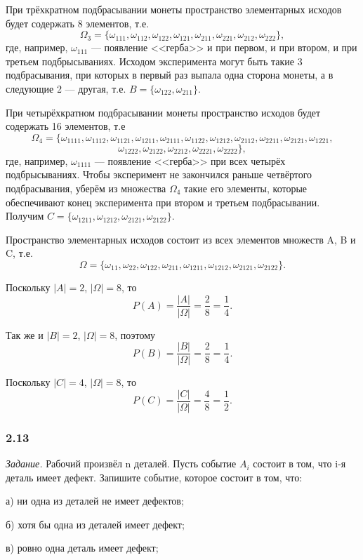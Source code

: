 \documentclass{book}
\begin{document}
При трёхкратном подбрасывании монеты пространство элементарных исходов будет содержать 8 элементов, т.е. $$\Omega_3=\{\omega_{111}, \omega_{112}, \omega_{122}, \omega_{121}, \omega_{211}, \omega_{221}, \omega_{212}, \omega_{222}\},$$ где, например, $\omega_{111}$ --- появление <<герба>> и при первом, и при втором, и при третьем подбрысываниях. Исходом эксперимента могут быть такие 3 подбрасывания, при которых в первый раз выпала одна сторона монеты, а в следующие 2 --- другая, т.е. $B=\{\omega_{122}, \omega_{211}\}$.

При четырёхкратном подбрасывании монеты пространство исходов будет содержать 16 элементов, т.е $$\Omega_4=\{\omega_{1111}, \omega_{1112}, \omega_{1121}, \omega_{1211}, \omega_{2111}, \omega_{1122}, \omega_{1212}, \omega_{2112}, \omega_{2211}, \omega_{2121}, \omega_{1221},$$$$\omega_{1222}, \omega_{2122}, \omega_{2212}, \omega_{2221}, \omega_{2222}\},$$ где, например, $\omega_{1111}$ --- появление <<герба>> при всех четырёх подбрысываниях. Чтобы эксперимент не закончился раньше четвёртого подбрасывания, уберём из множества $\Omega_4$ такие его элементы, которые обеспечивают конец эксперимента при втором и третьем подбрасывании. Получим $C=\{\omega_{1211}, \omega_{1212}, \omega_{2121}, \omega_{2122}\}$.

Пространство элементарных исходов состоит из всех элементов множеств A, B и C, т.е. $$\Omega=\{\omega_{11}, \omega_{22}, \omega_{122}, \omega_{211}, \omega_{1211}, \omega_{1212}, \omega_{2121}, \omega_{2122}\}.$$

Поскольку $|A|=2$, $|\Omega|=8$, то $$P(A)=\frac{|A|}{|\Omega|}=\frac{2}{8}=\frac{1}{4}.$$

Так же и $|B|=2$, $|\Omega|=8$, поэтому $$P(B)=\frac{|B|}{|\Omega|}=\frac{2}{8}=\frac{1}{4}.$$

Поскольку $|C|=4$, $|\Omega|=8$, то $$P(C)=\frac{|C|}{|\Omega|}=\frac{4}{8}=\frac{1}{2}.$$

\subsubsection*{2.13}

\textit{Задание.} Рабочий произвёл n деталей. Пусть событие $A_i$ состоит в том, что i-я деталь имеет дефект. Запишите событие, которое состоит в том, что:

а) ни одна из деталей не имеет дефектов;

б) хотя бы одна из деталей имеет дефект;

в) ровно одна деталь имеет дефект;
\end{document}
